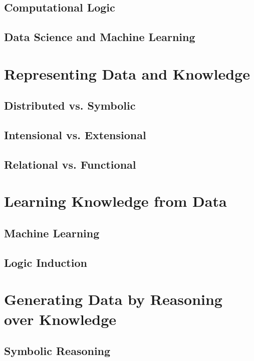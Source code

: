\documentclass[12pt,a4paper,openright,twoside]{book}
\begin{document}
\section{Computational Logic}

\section{Data Science and Machine Learning}

\chapter{Representing Data and Knowledge}

\section{Distributed vs. Symbolic}

\section{Intensional vs. Extensional}

\section{Relational vs. Functional}

\chapter{Learning Knowledge from Data}

\section{Machine Learning}

\section{Logic Induction}

\chapter{Generating Data by Reasoning over Knowledge}

\section{Symbolic Reasoning}
\end{document}
